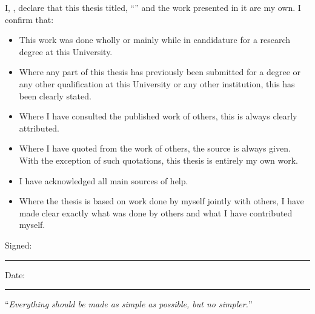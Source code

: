 \documentclass[
11pt, %
english, %
singlespacing, %
headsepline, %
]{MastersDoctoralThesis} %
\begin{document}

\begin{declaration}
\addchaptertocentry{\authorshipname} %
\noindent I, \authorname, declare that this thesis titled, \enquote{\ttitle} and the work presented in it are my own. I confirm that:

\begin{itemize} 
\item This work was done wholly or mainly while in candidature for a research degree at this University.
\item Where any part of this thesis has previously been submitted for a degree or any other qualification at this University or any other institution, this has been clearly stated.
\item Where I have consulted the published work of others, this is always clearly attributed.
\item Where I have quoted from the work of others, the source is always given. With the exception of such quotations, this thesis is entirely my own work.
\item I have acknowledged all main sources of help.
\item Where the thesis is based on work done by myself jointly with others, I have made clear exactly what was done by others and what I have contributed myself.\\
\end{itemize}
 
\noindent Signed:\\
\rule[0.5em]{25em}{0.5pt} %
 
\noindent Date:\\
\rule[0.5em]{25em}{0.5pt} %
\end{declaration}

\cleardoublepage


\vspace*{0.2\textheight}

\noindent\enquote{\itshape Everything should be made as simple as possible, but no simpler.}\bigbreak
\end{document}
